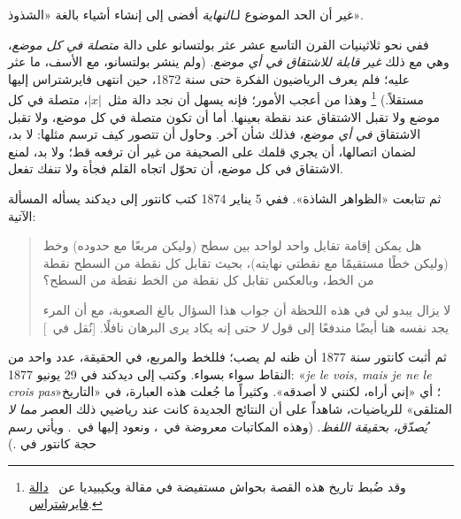 \documentclass[../../../include/open-logic-section]{subfiles}
\begin{document}

غير أن الحد الموضوع لـ\emph{النهاية} أفضى إلى إنشاء أشياء بالغة «الشذوذ».

ففي نحو ثلاثينيات القرن التاسع عشر عثر بولتسانو على دالة \emph{متصلة في
كل موضع}، وهي مع ذلك \emph{غير قابلة للاشتقاق في أي موضع}. (ولم ينشر
بولتسانو، مع الأسف، ما عثر عليه؛ فلم يعرف الرياضيون الفكرة حتى سنة 1872،
حين انتهى فايرشتراس إليها مستقلاً.) \footnote{وقد ضُبط تاريخ هذه القصة
بحواش مستفيضة في مقالة ويكيبيديا عن
~\href{http://en.wikipedia.org/wiki/Weierstrass_function}{دالة
فايرشتراس}.} وهذا من أعجب الأمور؛ فإنه يسهل أن نجد دالة مثل~$|x|$، متصلة
في كل موضع ولا تقبل الاشتقاق عند نقطة بعينها. أما أن تكون متصلة في كل
موضع، ولا تقبل الاشتقاق \emph{في أي موضع}، فذلك شأن آخر. وحاول أن تتصور
كيف ترسم مثلها: لا بد، لضمان اتصالها، أن يجري قلمك على الصحيفة من غير أن
ترفعه قط؛ ولا بد، لمنع الاشتقاق في كل موضع، أن تحوّل اتجاه القلم فجأة ولا
تنفك تفعل.

ثم تتابعت «الظواهر الشاذة». ففي 5 يناير 1874 كتب كانتور إلى ديدكند يسأله
المسألة الآتية:
\begin{quote}
هل يمكن إقامة تقابل واحد لواحد بين سطح (وليكن مربعًا مع حدوده) وخط
(وليكن خطًا مستقيمًا مع نقطتي نهايته)، بحيث تقابل كل نقطة من السطح
نقطة من الخط، وبالعكس تقابل كل نقطة من الخط نقطة من السطح؟

لا يزال يبدو لي في هذه اللحظة أن جواب هذا السؤال بالغ الصعوبة، مع أن
المرء يجد نفسه هنا أيضًا مندفعًا إلى قول \emph{لا} حتى إنه يكاد يرى
البرهان نافلًا.
[نُقل في~\citealt{Gouvea2011}]
\end{quote}
ثم أثبت كانتور سنة 1877 أن ظنه لم يصب؛ فللخط والمربع، في الحقيقة، عدد
واحد من النقاط سواء بسواء. وكتب إلى ديدكند في 29 يونيو 1877:
«\emph{je le vois, mais je ne le crois pas}»؛ أي «إني أراه، لكنني لا
أصدقه». وكثيراً ما جُعلت هذه العبارة، في «التاريخ المتلقى» للرياضيات،
شاهداً على أن النتائج الجديدة كانت عند رياضيي ذلك العصر \emph{مما لا
يُصدّق، بحقيقة اللفظ}. (وهذه المكاتبات معروضة في~\citet{Gouvea2011}،
ونعود إليها في~. ويأتي رسم حجة كانتور في
.)
\end{document}
